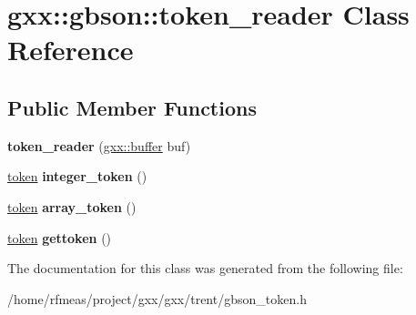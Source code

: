 \hypertarget{classgxx_1_1gbson_1_1token__reader}{}\section{gxx\+:\+:gbson\+:\+:token\+\_\+reader Class Reference}
\label{classgxx_1_1gbson_1_1token__reader}
\subsection*{Public Member Functions}
\begin{DoxyCompactItemize}
\item 
{\bfseries token\+\_\+reader} (\hyperlink{classgxx_1_1buffer}{gxx\+::buffer} buf)\hypertarget{classgxx_1_1gbson_1_1token__reader_a5ff3f98c08b76b83f5c328d293b0f91d}{}\label{classgxx_1_1gbson_1_1token__reader_a5ff3f98c08b76b83f5c328d293b0f91d}

\item 
\hyperlink{structgxx_1_1gbson_1_1token}{token} {\bfseries integer\+\_\+token} ()\hypertarget{classgxx_1_1gbson_1_1token__reader_aa0fa054e1718febae91368238c1c015d}{}\label{classgxx_1_1gbson_1_1token__reader_aa0fa054e1718febae91368238c1c015d}

\item 
\hyperlink{structgxx_1_1gbson_1_1token}{token} {\bfseries array\+\_\+token} ()\hypertarget{classgxx_1_1gbson_1_1token__reader_adba80852c528c858fa8bff2e0d4e0e20}{}\label{classgxx_1_1gbson_1_1token__reader_adba80852c528c858fa8bff2e0d4e0e20}

\item 
\hyperlink{structgxx_1_1gbson_1_1token}{token} {\bfseries gettoken} ()\hypertarget{classgxx_1_1gbson_1_1token__reader_a2cfeacd0aa5a0e7fd9d555fa54d986f7}{}\label{classgxx_1_1gbson_1_1token__reader_a2cfeacd0aa5a0e7fd9d555fa54d986f7}

\end{DoxyCompactItemize}


The documentation for this class was generated from the following file\+:\begin{DoxyCompactItemize}
\item 
/home/rfmeas/project/gxx/gxx/trent/gbson\+\_\+token.\+h\end{DoxyCompactItemize}
